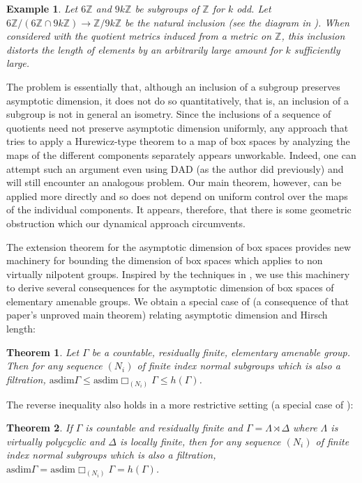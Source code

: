 \documentclass[12pt]{article}
\newcommand{\asdim}{\text{asdim}}
\newcommand{\Z}{\mathbb{Z}}
\newcommand{\dad}{\text{DAD}}
\newtheorem{thmx}{Theorem} %
\newtheorem*{theorem*}{Example}
\begin{document}
\begin{theorem*}Let $6\Z$ and $9k\Z$ be subgroups of $\Z$ for $k$ odd.  Let $6\Z/(6\Z\cap 9k\Z)\to \Z/9k\Z$ be the natural inclusion (see the diagram in \cite[Remark 4.2]{finnsell2015asymptotic}).  When considered with the quotient metrics induced from a metric on $\Z$, this inclusion distorts the length of elements by an arbitrarily large amount for $k$ sufficiently large.  \end{theorem*}

\normalfont
The problem is essentially that, although an inclusion of a subgroup preserves asymptotic dimension, it does not do so quantitatively, that is, an inclusion of a subgroup is not in general an isometry.  Since the inclusions of a sequence of quotients need not preserve asymptotic dimension uniformly, any approach that tries to apply a Hurewicz-type theorem to a map of box spaces by analyzing the maps of the different components separately appears unworkable.  Indeed, one can attempt such an argument even using $\dad$ (as the author did previously) and will still encounter an analogous problem.  Our main theorem, however, can be applied more directly and so does not depend on uniform control over the maps of the individual components.  It appears, therefore, that there is some geometric obstruction which our dynamical approach circumvents.  

The extension theorem for the asymptotic dimension of box spaces provides new machinery for bounding the dimension of box spaces which applies to non virtually nilpotent groups.  Inspired by the techniques in \cite[Section 4]{finnsell2015asymptotic}, we use this machinery to derive several consequences for the asymptotic dimension of box spaces of elementary amenable groups.  We obtain a special case of \cite[Theorems B]{finnsell2015asymptotic} (a consequence of that paper's unproved main theorem) relating asymptotic dimension and Hirsch length:  

\begin{thmx} Let $\Gamma$ be a countable, residually finite, elementary amenable group.  Then for any sequence  $(N_i)$ of finite index normal subgroups which is also a filtration, $\asdim \Gamma\leq \asdim\Box_{(N_i)} \Gamma\leq h(\Gamma)$.  
\end{thmx}

The reverse inequality also holds in a more restrictive setting (a special case of \cite[Theorem C]{finnsell2015asymptotic}):

\begin{thmx}
If $\Gamma$ is countable and residually finite and $\Gamma = \Lambda\rtimes \Delta$ where $\Lambda$ is virtually polycyclic and $\Delta$ is locally finite, then for any sequence $(N_i)$ of finite index normal subgroups which is also a filtration, $\asdim\Gamma = \asdim\Box_{(N_i)}\Gamma = h(\Gamma)$.  
\end{thmx}
\end{document}
